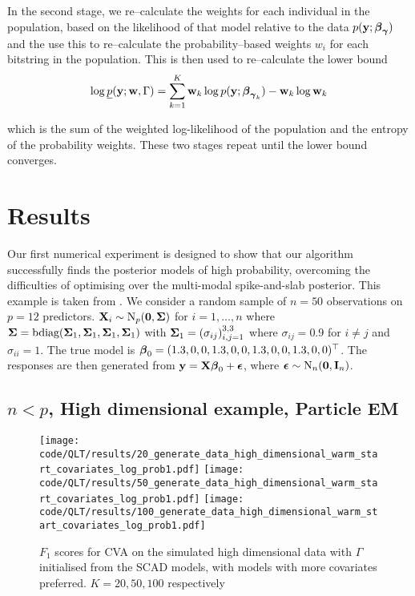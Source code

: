 \documentclass{amsart}[12pt]
\begin{document}
In the second stage, we re--calculate the weights for each individual in the population, based on the
likelihood of that model relative to the data $p({\bf y}; {\boldsymbol \beta}_{\boldsymbol \gamma})$ and the use this to re--calculate the
probability--based weights $w_i$ for each bitstring in the population. This is then used to re--calculate the
lower bound
\[
	\log \underline{p}({\bf y}; {\bf w}, \Gamma) = \sum_{k=1}^K {\bf w}_k \log p({\bf y}; {\boldsymbol \beta}_{{\boldsymbol \gamma}_k}) - {\bf w}_k \log {\bf w}_k
\]

which is the sum of the weighted log-likelihood of the population and the entropy of the probability weights.
These two stages repeat until the lower bound converges.

\section{Results}


Our first numerical experiment is designed to show that our algorithm successfully finds the posterior models
of high probability, overcoming the difficulties of optimising over the multi-modal spike-and-slab posterior.
This example is taken from \citep{Rockova2016}. 
We consider a random sample of $n = 50$ observations on $p = 12$ predictors. ${\bf X}_i \sim \text{N}_p({\bf 0}, {\boldsymbol \Sigma})$
for $i = 1, \ldots, n$ where
${\boldsymbol \Sigma} = \text{bdiag}({\boldsymbol \Sigma}_1, {\boldsymbol \Sigma}_1, {\boldsymbol \Sigma}_1, {\boldsymbol \Sigma}_1)$ with
${\boldsymbol \Sigma}_1 = (\sigma_{ij})_{i, j = 1}^{3, 3}$ where $\sigma_{ij} = 0.9$ for $i \ne j$ and $\sigma_{ii} = 1$.
The true model is ${\boldsymbol \beta}_0 = (1.3, 0, 0, 1.3, 0, 0, 1.3, 0, 0, 1.3, 0, 0)^\top$.
The responses are then generated from ${\bf y} = {\bf X} {\boldsymbol \beta}_0 + {\boldsymbol \epsilon}$, where
${\boldsymbol \epsilon} \sim \text{N}_n({\bf 0}, {\bf I}_n)$.

\subsection{$n < p$, High dimensional example, Particle EM}

\begin{figure}\label{fig:highdim_warm_start_covariates}
\caption{$F_1$ scores for CVA on the simulated high dimensional data with $\Gamma$ initialised from the SCAD models, with models with more covariates preferred. $K=20, 50, 100$ respectively}
\texttt{[image: code/QLT/results/20\_generate\_data\_high\_dimensional\_warm\_start\_covariates\_log\_prob1.pdf]}
\texttt{[image: code/QLT/results/50\_generate\_data\_high\_dimensional\_warm\_start\_covariates\_log\_prob1.pdf]}
\texttt{[image: code/QLT/results/100\_generate\_data\_high\_dimensional\_warm\_start\_covariates\_log\_prob1.pdf]}
\end{figure}
\end{document}
